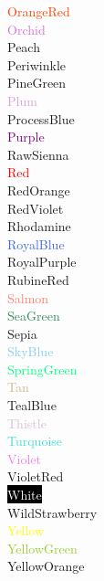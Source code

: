 \documentclass{article}
\begin{document}
\textcolor{OrangeRed}{OrangeRed}\\
\textcolor{Orchid}{Orchid}\\
\textcolor{Peach}{Peach}\\
\textcolor{Periwinkle}{Periwinkle}\\
\textcolor{PineGreen}{PineGreen}\\
\textcolor{Plum}{Plum}\\
\textcolor{ProcessBlue}{ProcessBlue}\\
\textcolor{Purple}{Purple}\\
\textcolor{RawSienna}{RawSienna}\\
\textcolor{Red}{Red}\\
\textcolor{RedOrange}{RedOrange}\\
\textcolor{RedViolet}{RedViolet}\\
\textcolor{Rhodamine}{Rhodamine}\\
\textcolor{RoyalBlue}{RoyalBlue}\\
\textcolor{RoyalPurple}{RoyalPurple}\\
\textcolor{RubineRed}{RubineRed}\\
\textcolor{Salmon}{Salmon}\\
\textcolor{SeaGreen}{SeaGreen}\\
\textcolor{Sepia}{Sepia}\\
\textcolor{SkyBlue}{SkyBlue}\\
\textcolor{SpringGreen}{SpringGreen}\\
\textcolor{Tan}{Tan}\\
\textcolor{TealBlue}{TealBlue}\\
\textcolor{Thistle}{Thistle}\\
\textcolor{Turquoise}{Turquoise}\\
\textcolor{Violet}{Violet}\\
\textcolor{VioletRed}{}VioletRed\\
\colorbox{black}{\textcolor{White}{White}}\\
\textcolor{WildStrawberry}{WildStrawberry}\\
\textcolor{Yellow}{Yellow}\\
\textcolor{YellowGreen}{YellowGreen}\\
\textcolor{YellowOrange}{YellowOrange}\\
\end{document}
